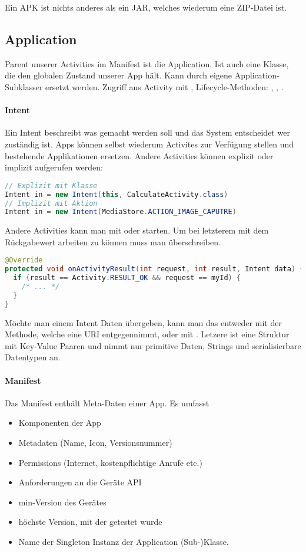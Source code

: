Ein APK ist nichts anderes als ein JAR, welches wiederum eine ZIP-Datei ist.

\subsection{Application}
Parent unserer Activities im Manifest ist die Application. Ist auch eine Klasse, die den globalen Zustand unserer App hält. Kann durch eigene Application-Subklasser ersetzt werden. Zugriff aus Activity mit , Lifecycle-Methoden: , , .


\paragraph{Intent} Ein Intent beschreibt was gemacht werden soll und das System entscheidet wer zuständig ist. Apps können selbst wiederum Activites zur Verfügung stellen und bestehende Applikationen ersetzen. Andere Activities können explizit oder implizit aufgerufen werden:
\begin{lstlisting}[language=java]
// Explizit mit Klasse
Intent in = new Intent(this, CalculateActivity.class)
// Implizit mit Aktion
Intent in = new Intent(MediaStore.ACTION_IMAGE_CAPUTRE)
\end{lstlisting}
Andere Activities kann man mit  oder  starten. Um bei letzterem mit dem Rückgabewert arbeiten zu können muss man  überschreiben.
\begin{lstlisting}[language=java]
@Override
protected void onActivityResult(int request, int result, Intent data) {
  if (result == Activity.RESULT_OK && request == myId) {
    /* ... */
  }
}
\end{lstlisting}
Möchte man einem Intent Daten übergeben, kann man das entweder mit der  Methode, welche eine URI entgegennimmt, oder mit . Letzere ist eine Struktur mit Key-Value Paaren und nimmt nur primitive Daten, Strings und serialisierbare Datentypen an.

\paragraph{Manifest} Das Manifest enthält Meta-Daten einer App. Es umfasst
\begin{itemize}
\item Komponenten der App
\item Metadaten (Name, Icon, Versionsnummer)
\item Permissions (Internet, kostenpflichtige Anrufe etc.)
\item Anforderungen an die Geräte API
\item {} min-Version des Gerätes
\item {} höchste Version, mit der getestet wurde
\item Name der Singleton Instanz der Application (Sub-)Klasse.
\end{itemize}

